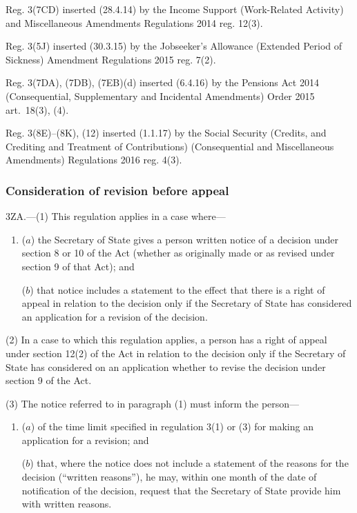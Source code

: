 \documentclass[12pt,a4paper]{article}
\begin{document}
{Reg. 3(7CD) inserted (28.4.14) by the Income Support (Work-Related Activity) and Miscellaneous Amendments Regulations 2014 reg. 12(3).

Reg. 3(5J) inserted (30.3.15) by the Jobseeker’s Allowance (Extended Period of Sickness) Amendment Regulations 2015 reg. 7(2).

Reg. 3(7DA), (7DB), (7EB)(d) inserted (6.4.16) by the Pensions Act 2014 (Consequential, Supplementary and Incidental Amendments) Order 2015 art.~18(3), (4).

Reg. 3(8E)--(8K), (12) inserted (1.1.17) by the Social Security (Credits, and Crediting and Treatment of Contributions) (Consequential and Miscellaneous Amendments) Regulations 2016 reg. 4(3).
}

\subsubsection[3ZA. Consideration of revision before appeal]{Consideration of revision before appeal}

3ZA.---(1)  This regulation applies in a case where—
\begin{enumerate}\item[]
($a$) the Secretary of State gives a person written notice of a decision under section 8 or 10 of the Act (whether as originally made or as revised under section 9 of that Act); and

($b$) that notice includes a statement to the effect that there is a right of appeal in relation to the decision only if the Secretary of State has considered an application for a revision of the decision.
\end{enumerate}

(2) In a case to which this regulation applies, a person has a right of appeal under section 12(2) of the Act in relation to the decision only if the Secretary of State has considered on an application whether to revise the decision under section 9 of the Act.

(3) The notice referred to in paragraph (1) must inform the person—
\begin{enumerate}\item[]
($a$) of the time limit specified in regulation 3(1) or (3) for making an application for a revision; and

($b$) that, where the notice does not include a statement of the reasons for the decision (“written reasons”), he may, within one month of the date of notification of the decision, request that the Secretary of State provide him with written reasons.
\end{enumerate}
\end{document}
